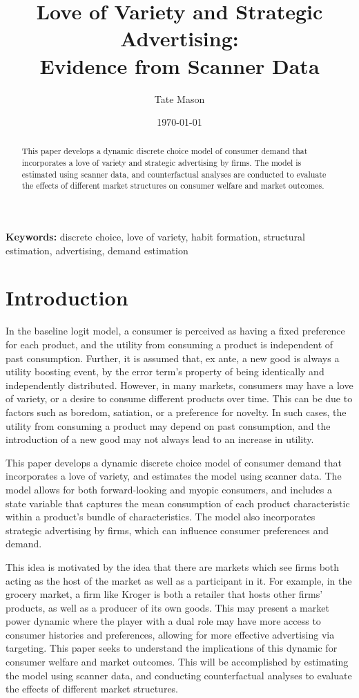 \documentclass[12pt]{article}
\title{\textbf{Love of Variety and Strategic Advertising:\\
               Evidence from Scanner Data}}
\author[1]{Tate Mason}
\affil[1]{John Munro Godfrey Sr. Department of Economics, University of Georgia}
\date{\today}
\begin{document}
\maketitle

\begin{abstract}
This paper develops a dynamic discrete choice model of consumer demand that incorporates a love of variety and strategic advertising by firms. The model is estimated using scanner data, and counterfactual analyses are conducted to evaluate the effects of different market structures on consumer welfare and market outcomes.
\end{abstract}

\noindent\textbf{Keywords:} discrete choice, love of variety, habit formation,
                             structural estimation, advertising, demand estimation

\newpage

\section{Introduction}

In the baseline logit model, a consumer is perceived as having a fixed preference for each product, and the utility from consuming a product is independent of past consumption. Further, it is assumed that, ex ante, a new good is always a utility boosting event, by the error term's property of being identically and independently distributed. However, in many markets, consumers may have a love of variety, or a desire to consume different products over time. This can be due to factors such as boredom, satiation, or a preference for novelty. In such cases, the utility from consuming a product may depend on past consumption, and the introduction of a new good may not always lead to an increase in utility.

This paper develops a dynamic discrete choice model of consumer demand that incorporates a love of variety, and estimates the model using scanner data. The model allows for both forward-looking and myopic consumers, and includes a state variable that captures the mean consumption of each product characteristic within a product's bundle of characteristics. The model also incorporates strategic advertising by firms, which can influence consumer preferences and demand.

This idea is motivated by the idea that there are markets which see firms both acting as the host of the market as well as a participant in it. For example, in the grocery market, a firm like Kroger is both a retailer that hosts other firms' products, as well as a producer of its own goods. This may present a market power dynamic where the player with a dual role may have more access to consumer histories and preferences, allowing for more effective advertising via targeting. This paper seeks to understand the implications of this dynamic for consumer welfare and market outcomes. This will be accomplished by estimating the model using scanner data, and conducting counterfactual analyses to evaluate the effects of different market structures.
\end{document}
